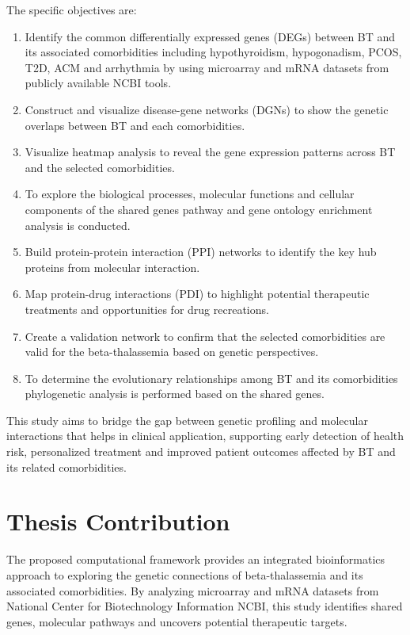 The specific objectives are:


\begin{enumerate}[label=\arabic*)]
\item Identify the common differentially expressed genes (DEGs) between BT and its associated comorbidities including hypothyroidism, hypogonadism, PCOS, T2D, ACM and arrhythmia by using microarray and mRNA datasets from publicly available NCBI tools.
\item Construct and visualize disease-gene networks (DGNs) to show the genetic overlaps between BT and each comorbidities.
\item Visualize heatmap analysis to reveal the gene expression patterns across BT and the selected comorbidities.
\item To explore the biological processes, molecular functions and cellular components of the shared genes pathway and gene ontology enrichment analysis is conducted.
\item Build protein-protein interaction (PPI) networks to identify the key hub proteins from molecular interaction.
\item Map protein-drug interactions (PDI) to highlight potential therapeutic treatments and opportunities for drug recreations.
\item Create a validation network to confirm that the selected comorbidities are valid for the beta-thalassemia based on genetic perspectives.
\item To determine the evolutionary relationships among BT and its comorbidities phylogenetic analysis is performed based on the shared genes.
\end{enumerate}


This study aims to bridge the gap between genetic profiling and molecular interactions that helps in clinical application, supporting early detection of health risk, personalized treatment and improved patient outcomes affected by BT and its related comorbidities.


\section{Thesis Contribution}
\label{sec:sec02}

The proposed computational framework provides an integrated bioinformatics approach to exploring the genetic connections of beta-thalassemia and its associated comorbidities. By analyzing microarray and mRNA datasets from National Center for Biotechnology Information NCBI, this study identifies shared genes, molecular pathways and uncovers potential therapeutic targets. 

